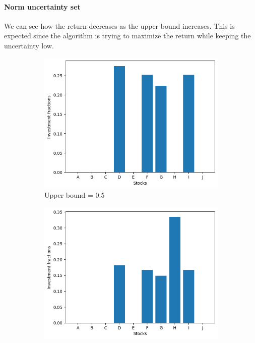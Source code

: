 \paragraph*{Norm uncertainty set}
We can see how the return decreases as the upper bound increases. This is expected since the algorithm is trying to maximize the return while keeping the uncertainty low.

\begin{figure}[H]
    \begin{subfigure}{0.5\textwidth}
        \includegraphics[width=\textwidth]{lab12/imgs/norm_05.png}
        \caption{Upper bound = 0.5}
    \end{subfigure}
    \begin{subfigure}{0.5\textwidth}
        \includegraphics[width=\textwidth]{lab12/imgs/norm_10.png}

\end{subfigure}
\end{figure}
